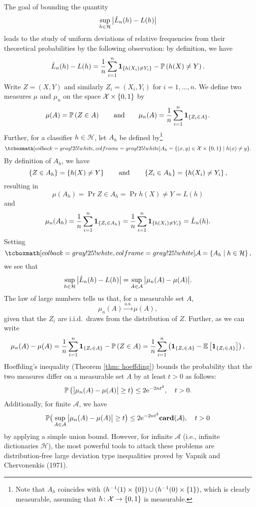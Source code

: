 The goal of bounding the quantity
\[
    \sup_{h \in \mathcal{H}} \big\lvert \hat L_n(h) - L(h) \big\rvert
\]
leads to the study of uniform deviations of relative frequencies from their theoretical probabilities by the following observation: by definition, we have
\[
    \hat L_n(h) - L(h) = \frac{1}{n} \sum_{i=1}^n \mathbf{1}_{\left\{h(X_i) \neq Y_i\right\}} - \mathbb{P}\left(h(X) \neq Y\right).
\]
Write $Z = (X, Y)$ and similarly $Z_i = (X_i, Y_i)$ for $i = 1, \dots, n$. We define two measures $\mu$ and $\mu_n$ on the space $\mathcal{X} \times \left\{0, 1\right\}$ by
\[
    \mu(A) = \mathbb{P}\left(Z \in A\right) \qquad \text{and} \qquad \mu_n(A) = \frac{1}{n} \sum_{i=1}^n \mathbf{1}_{\left\{Z_i \in A\right\}}.
\]
Further, for a classifier $h \in \mathcal{H}$, let $A_h$ be defined by\footnote{Note that $A_h$ coincides with $(h^{-1}(1) \times \left\{0\right\}) \cup (h^{-1}(0) \times \left\{1\right\})$, which is clearly measurable, assuming that $h \colon \mathcal{X} \to \left\{0, 1\right\}$ is measurable.}
\begin{equation}
\label{eq: sets A_h}
    \highlightMath{
        A_h = \{ (x, y) \in \mathcal{X} \times \set{0, 1} \with h(x) \neq y \}.
    }
\end{equation}
By definition of $A_h$, we have
\[
    \left\{Z \in A_h\right\} = \left\{h(X) \neq Y\right\} \qquad \text{and} \qquad \left\{Z_i \in A_h\right\} = \left\{h(X_i) \neq Y_i\right\},
\]
resulting in
\[
    \mu(A_h) = \Pr{Z \in A_h} = \Pr{h(X) \neq Y} = L(h)
\]
and
\[
    \mu_n(A_h) = \frac{1}{n} \sum_{i=1}^n \mathbf{1}_{\left\{Z_i \in A_h\right\}} = \frac{1}{n} \sum_{i=1}^n \mathbf{1}_{\left\{h(X_i) \neq Y_i\right\}} = \hat L_n(h).
\]
Setting
\begin{equation}
\label{eq: collection of sets A_h}
    \highlightMath{
        \mathcal{A} = \set{A_h \with h \in \mathcal{H}},
    }
\end{equation}
we see that
\[
    \sup_{h \in \mathcal{H}} \big\lvert \hat L_n(h) - L(h) \big\rvert = \sup_{A \in \mathcal{A}} \big\lvert \mu_n(A) - \mu(A) \big\rvert.
\]
The law of large numbers tells us that, for a measurable set $A$,
\[
    \mu_n(A) \xrightarrow{\mathrm{a.s.}} \mu(A),
\]
given that the $Z_i$ are i.i.d.\ draws from the distribution of $Z$. Further, as we can write
\[
    \mu_n(A) - \mu(A) = \frac{1}{n} \sum_{i=1}^n \mathbf{1}_{\left\{Z_i \in A\right\}} - \mathbb{P}\left(Z \in A\right) = \frac{1}{n} \sum_{i=1}^n \left( \mathbf{1}_{\left\{Z_i \in A\right\}} - \mathbb{E}\left[\mathbf{1}_{\left\{Z_i \in A\right\}}\right] \right),
\]
Hoeffding's inequality (Theorem \ref{thm: hoeffding}) bounds the probability that the two measures differ on a measurable set $A$ by at least $t > 0$ as follows:
\[
    \mathbb{P}\left(\big\lvert \mu_n(A) - \mu(A) \big\rvert \geq t\right) \leq 2\mathrm{e}^{-2nt^2}, \quad t > 0.
\]
Additionally, for finite $\mathcal{A}$, we have
\[
    \mathbb{P}\big( \sup_{A \in \mathcal{A}} \big\lvert \mu_n(A) - \mu(A) \big\rvert \geq t \big) \leq 2\mathrm{e}^{-2nt^2} \mathrm{\mathbf{card}}(\mathcal{A}), \quad t > 0
\]
by applying a simple union bound. However, for infinite $\mathcal{A}$ (i.e., infinite dictionaries $\mathcal{H}$), the most powerful tools to attack these problems are distribution-free large deviation type inequalities proved by Vapnik and Chervonenkis (1971).


